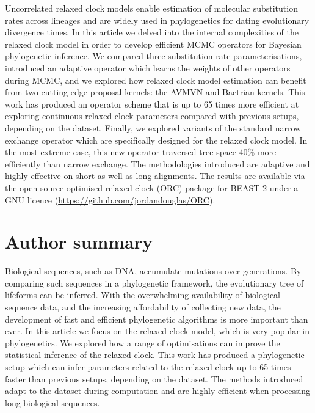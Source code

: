 \documentclass[10pt,letterpaper]{article}
\begin{document}
Uncorrelated relaxed clock models enable estimation of molecular substitution rates across lineages and are widely used in phylogenetics for dating evolutionary divergence times.
In this article we delved into the internal complexities of the relaxed clock model in order to develop efficient MCMC operators for Bayesian phylogenetic inference.
We compared three substitution rate parameterisations, introduced an adaptive operator which learns the weights of other operators during MCMC, and we explored how relaxed clock model estimation can benefit from two cutting-edge proposal kernels: the AVMVN and Bactrian kernels.
This work has produced an operator scheme that is up to 65 times more efficient at exploring continuous relaxed clock parameters compared with previous setups, depending on the dataset. 
Finally, we explored variants of the standard narrow exchange operator which are specifically designed for the relaxed clock model.
In the most extreme case, this new operator traversed tree space 40\% more efficiently than narrow exchange.
The methodologies introduced are adaptive and highly effective on short as well as long alignments.
The results are available via the open source optimised relaxed clock (ORC) package for BEAST 2 under a GNU licence (\url{https://github.com/jordandouglas/ORC}).

\section*{Author summary}

Biological sequences, such as DNA, accumulate mutations over generations. 
By comparing such sequences in a phylogenetic framework, the evolutionary tree of lifeforms can be inferred.
With the overwhelming availability of biological sequence data, and the increasing affordability of collecting new data, the development of fast and efficient phylogenetic algorithms is more important than ever.
In this article we focus on the relaxed clock model, which is very popular in phylogenetics.
We explored how a range of optimisations can improve the statistical inference of the relaxed clock.
This work has produced a phylogenetic setup which can infer parameters related to the relaxed clock up to 65 times faster than previous setups, depending on the dataset. 
The methods introduced adapt to the dataset during computation and are highly efficient when processing long biological sequences.    
\end{document}
